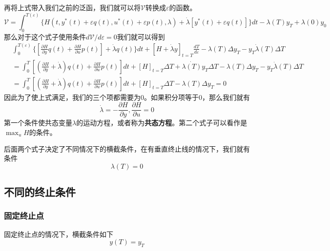 \documentclass[UTF8,12pt]{ctexart}
\numberwithin{equation}{section} %
\numberwithin{figure}{section}
\numberwithin{table}{section}
\begin{document}
	再将上式带入我们之前的泛函，我们就可以将$\mathscr{V}$转换成$\varepsilon$的函数。
	\begin{equation}
		\mathscr{V}=\int_{0}^{T(\varepsilon)}\{H(t,y^*(t) + \varepsilon q(t),u^*(t) + \varepsilon p(t),\lambda) + \dot{\lambda}[y^*(t) + \varepsilon q(t)]\}dt - \lambda(T)y_T + \lambda(0)y_0
	\end{equation}
	那么对于这个式子使用条件$d\mathscr{V}/d\varepsilon = 0$我们就可以得到
	\begin{equation}
		\begin{aligned}
			&\int_{0}^{T(\varepsilon)}\{[\frac{\partial H}{\partial y}q(t) + \frac{\partial H}{\partial u}p(t)] + \dot{\lambda}q(t)\}dt 
			+ [H + \dot{\lambda}y]_{t = T}\frac{dT}{d\varepsilon} 
			- \lambda(T)\Delta y_T 
			- y_T\dot{\lambda}(T)\Delta T \\
			&=\int_{0}^{T}[(\frac{\partial H}{\partial y} + \dot{\lambda})q(t) + \frac{\partial H}{\partial u}p(t)]dt
			+ [H]_{t = T}\Delta T 
			+  \dot{\lambda(T)}y_T\Delta T
			- \lambda(T)\Delta y_T 
			- y_T\dot{\lambda}(T)\Delta T \\
			&=\int_{0}^{T}[(\frac{\partial H}{\partial y} + \dot{\lambda})q(t) + \frac{\partial H}{\partial u}p(t)]dt
			+ [H]_{t = T}\Delta T 
			- \lambda(T)\Delta y_T  = 0
			\label{variations perspective}
		\end{aligned}
	\end{equation}
	因此为了使上式满足，我们的三个项都需要为0。如果积分项等于0，那么我们就有
	\begin{equation}
		\dot{\lambda} = -\frac{\partial H}{\partial y},\frac{\partial H}{\partial u} = 0
	\end{equation}
	第一个条件使共态变量$\lambda$的运动方程，或者称为\textbf{共态方程}。第二个式子可以看作是$\max_{u}H$的条件。
	
	后面两个式子决定了不同情况下的横截条件，在有垂直终止线的情况下，我们就有条件
	\begin{equation}
		\lambda(T) = 0
	\end{equation}
	
	\subsection{不同的终止条件}
	
	\subsubsection{固定终止点}
	固定终止点的情况下，横截条件如下
	\begin{equation}
		y(T) = y_T
	\end{equation}
	
\end{document}

